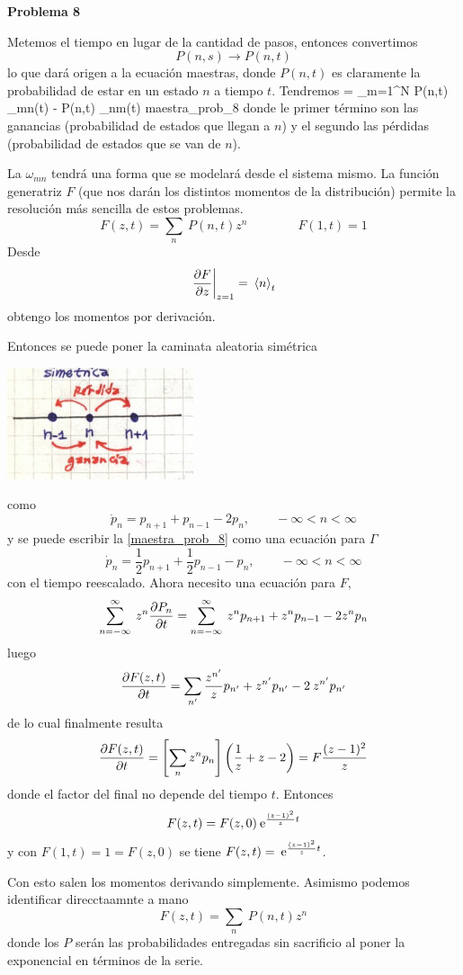 \documentclass[10pt,oneside]{CBFT_book}
\begin{document}
\begin{ejemplo}{\bf Problema 8}

Metemos el tiempo en lugar de la cantidad de pasos, entonces convertimos
\[
	P(n,s) \longrightarrow P(n,t)
\]
lo que dará origen a la ecuación maestras, donde $P(n,t)$ es claramente la probabilidad de estar en
un estado $n$ a tiempo $t$.
Tendremos
\be
	 = \sum_{m=1}^N \: 
	P(n,t) \omega_{mn}(t) - P(n,t) \omega_{nm}(t)
	maestra_prob_8
\ee
donde le primer término son las ganancias (probabilidad de estados que llegan a $n$) y el segundo las
pérdidas (probabilidad de estados que se van de $n$).

La $\omega_{mn}$ tendrá una forma que se modelará desde el sistema mismo. La función generatriz $F$
(que nos darán los distintos momentos de la distribución)
permite la resolución más sencilla de estos problemas.
\[
	F(z,t) = \sum_n \: P(n,t) z^n \qquad \qquad F(1,t)=1
\]
Desde 
\[
	\left.\frac{\partial^{\hspace{-0.05em}} {F}}{\partial {z}^{\hspace{-0.05em}}}\right|_{z=1} = \:\left\langle n \right\rangle_t
\]
obtengo los momentos por derivación.

Entonces se puede poner la caminata aleatoria simétrica

\includegraphics[scale=0.5]{images/1606329264.jpg}

como
\[
	\dot{p}_n = p_{n+1} + p_{n-1} - 2 p_n, \qquad -\infty < n < \infty 
\]
y se puede escribir la \eqref{maestra_prob_8} como una ecuación para $ \Gamma$
\[
	\dot{p}_n = \frac{1}{2} p_{n+1} + \frac{1}{2} p_{n-1} - p_n, \qquad -\infty < n < \infty 
\]
con el tiempo reescalado. Ahora necesito una ecuación para $F$,
\[
	\sum_{n=-\infty}^\infty \: z^n \frac{\partial^{\hspace{-0.05em}} {P_n}}{\partial {t}^{\hspace{-0.05em}}} = 
	\sum_{n=-\infty}^\infty \: z^n p_{n+1} + z^n p_{n-1} - 2 z^n p_{n}
\]
luego
\[
	\frac{\partial^{\hspace{-0.05em}} {F(z,t)}}{\partial {t}^{\hspace{-0.05em}}} = \sum_{n'} \frac{z^{n'}}{z} p_{n'} + 
	z^{n'} p_{n'} - 2 \: z^{n'} p_{n'}
\]
de lo cual finalmente resulta
\[
	\frac{\partial^{\hspace{-0.05em}} {F(z,t)}}{\partial {t}^{\hspace{-0.05em}}} = \left[ \sum_n z^n p_n \right]\left( \frac{1}{z} + z - 2  \right)
	= F \frac{(z-1)^2}{z}
\]
donde el factor del final no depende del tiempo $t$. Entonces
\[
	F(z,t) = F(z,0) \:\mathrm{e}^{ \frac{(z-1)^2}{z} t }
\]
y con $F(1,t)=1=F(z,0)$ se tiene $F(z,t) = \:\mathrm{e}^{ \frac{(z-1)^2}{z} t }$.

Con esto salen los momentos derivando simplemente. Asimismo podemos identificar direcctaamnte
a mano
\[
	F(z,t) = \sum_n \: P(n,t) z^n
\]
donde los $P$ serán las probabilidades entregadas sin sacrificio al poner la exponencial en
términos de la serie.
 
\end{ejemplo}
\end{document}
